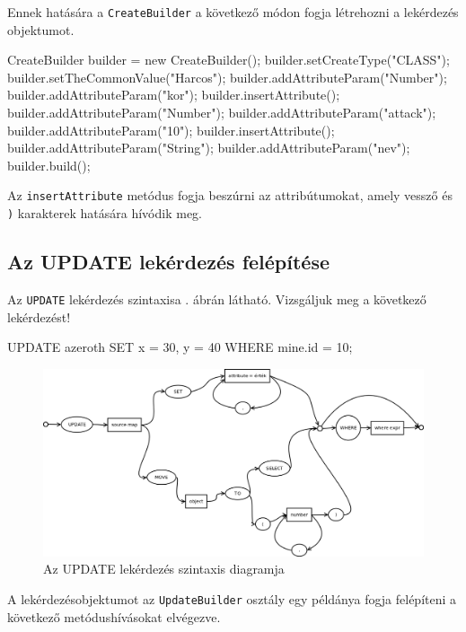 Ennek hatására a \texttt{CreateBuilder} a következő módon fogja létrehozni a lekérdezés objektumot.

\begin{java}
CreateBuilder builder = new CreateBuilder();
builder.setCreateType("CLASS");
builder.setTheCommonValue("Harcos");
builder.addAttributeParam("Number");
builder.addAttributeParam("kor");
builder.insertAttribute();
builder.addAttributeParam("Number");
builder.addAttributeParam("attack");
builder.addAttributeParam("10");
builder.insertAttribute();
builder.addAttributeParam("String");
builder.addAttributeParam("nev");
builder.build();
\end{java}

Az \texttt{insertAttribute} metódus fogja beszúrni az attribútumokat, amely vessző és \texttt{)} karakterek hatására hívódik meg.

\subsection{Az UPDATE lekérdezés felépítése}

Az \texttt{UPDATE} lekérdezés szintaxisa . ábrán látható. Vizsgáljuk meg a következő lekérdezést!
\begin{sql}
UPDATE azeroth SET x = 30, y = 40 WHERE mine.id = 10;
\end{sql}

\begin{figure}[htb]
	\begin{center}
		\includegraphics[scale=0.4]{images/update}
		\caption{Az UPDATE lekérdezés szintaxis diagramja}
		\label{fig:updateSytnax}
	\end{center}
\end{figure}

A lekérdezésobjektumot az \texttt{UpdateBuilder} osztály egy példánya fogja felépíteni a következő  metódushívásokat elvégezve.

